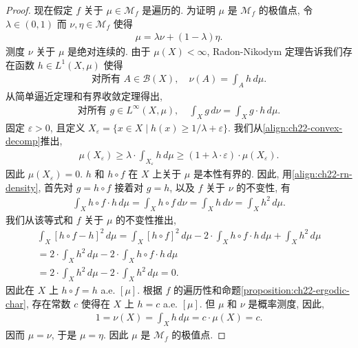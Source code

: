 \documentclass[../../main.tex]{subfiles}
\begin{document}
\begin{proof}
现在假定 $f$ 关于 $\mu\in\mathcal{M}_{f}$ 是遍历的. 为证明 $\mu$ 是 $\mathcal{M}_{f}$ 的极值点, 令 $\lambda\in(0,1)$ 而 $\nu,\eta\in\mathcal{M}_{f}$ 使得
\begin{align}
\mu=\lambda\nu+(1-\lambda)\eta.
\label{align:ch22-convex-decomp}
\end{align}
测度 $\nu$ 关于 $\mu$ 是绝对连续的. 由于 $\mu(X)<\infty$, Radon-Nikodym 定理告诉我们存在函数 $h\in L^{1}(X,\mu)$ 使得
\begin{align*}
\text{对所有 }A\in\mathcal{B}(X),\quad\nu(A)=\int_{A}h\,d\mu.
\end{align*}
从简单逼近定理和有界收敛定理得出,
\begin{align}
\text{对所有 }g\in L^{\infty}(X,\mu),\quad\int_{X}g\,d\nu=\int_{X}g\cdot h\,d\mu.
\label{align:ch22-rn-density}
\end{align}
固定 $\varepsilon>0$, 且定义 $X_{\varepsilon}=\{x\in X\mid h(x)\geqslant 1/\lambda+\varepsilon\}$. 我们从\eqref{align:ch22-convex-decomp}推出,
\begin{align*}
\mu(X_{\varepsilon})\geqslant\lambda\cdot\int_{X_{\varepsilon}}h\,d\mu\geqslant(1+\lambda\cdot\varepsilon)\cdot\mu(X_{\varepsilon}).
\end{align*}
因此 $\mu(X_{\varepsilon})=0$. $h$ 和 $h\circ f$ 在 $X$ 上关于 $\mu$ 是本性有界的. 因此, 用\eqref{align:ch22-rn-density}, 首先对 $g=h\circ f$ 接着对 $g=h$, 以及 $f$ 关于 $\nu$ 的不变性, 有
\begin{align*}
\int_{X}h\circ f\cdot h\,d\mu=\int_{X}h\circ f\,d\nu=\int_{X}h\,d\nu=\int_{X}h^{2}\,d\mu.
\end{align*}
我们从该等式和 $f$ 关于 $\mu$ 的不变性推出,
\begin{align*}
\int_{X}[h\circ f-h]^{2}\,d\mu=\int_{X}[h\circ f]^{2}\,d\mu-2\cdot\int_{X}h\circ f\cdot h\,d\mu+\int_{X}h^{2}\,d\mu\\
=2\cdot\int_{X}h^{2}\,d\mu-2\cdot\int_{X}h\circ f\cdot h\,d\mu\\
=2\cdot\int_{X}h^{2}\,d\mu-2\cdot\int_{X}h^{2}\,d\mu=0.
\end{align*}
因此在 $X$ 上 $h\circ f=h$ a.e. $[\mu]$. 根据 $f$ 的遍历性和命题\cref{proposition:ch22-ergodic-char}, 存在常数 $c$ 使得在 $X$ 上 $h=c$ a.e. $[\mu]$. 但 $\mu$ 和 $\nu$ 是概率测度, 因此,
\begin{align*}
1=\nu(X)=\int_{X}h\,d\mu=c\cdot\mu(X)=c.
\end{align*}
因而 $\mu=\nu$, 于是 $\mu=\eta$. 因此 $\mu$ 是 $\mathcal{M}_{f}$ 的极值点.
\end{proof}
\end{document}
